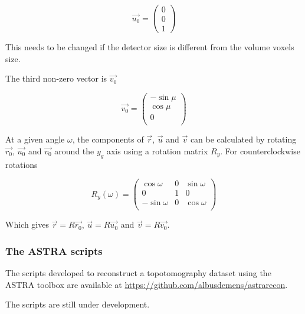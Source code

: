 \documentclass[11pt]{scrartcl}
\begin{document}
\begin{equation}
{\vec{u_0}} = \left(\begin{matrix}
0\\ 0 \\ 1
\end{matrix}\right)
\end{equation}

\danger This needs to be changed if the detector size is different from the volume voxels size.

The third non-zero vector is ${\vec{v_0}}$

\begin{equation}
\vec{v_0} = \left(\begin{matrix}
-\sin\mu\\ \cos\mu\\ 0\\
\end{matrix}\right)
\end{equation}

At a given angle $\omega$, the components of ${\vec{r}}$, ${\vec{u}}$ and ${\vec{v}}$ can be calculated by rotating $\vec{r_0}$, $\vec{u_0}$ and $\vec{v_0}$ around the $y_g$ axis using a rotation matrix $R_y$. For counterclockwise rotations

\begin{equation}
R_y(\omega) = \begin{pmatrix}
\cos \omega & 0 & \sin \omega \\
0 & 1 & 0 \\
-\sin \omega & 0 & \cos \omega \\
\end{pmatrix}
\end{equation}

Which gives $\vec{r} = R \vec{r_0}$, $\vec{u} = R \vec{u_0}$ and $\vec{v} = R \vec{v_0}$.

\subsubsection{The ASTRA scripts}

The scripts developed to reconstruct a topotomography dataset using the {\footnotesize{ASTRA}} toolbox are available at \url{https://github.com/albusdemens/astrarecon}.

\danger The scripts are still under development.
\end{document}
